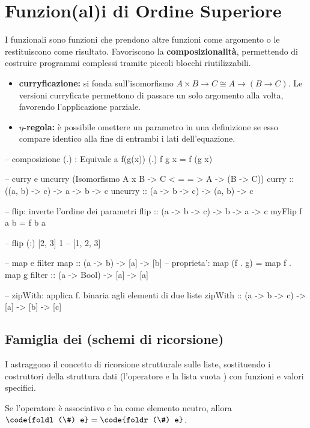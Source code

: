 \section{Funzion(al)i di Ordine Superiore}
I funzionali sono funzioni che prendono altre funzioni come argomento o le restituiscono come risultato. Favoriscono la \textbf{composizionalità}, permettendo di costruire programmi complessi tramite piccoli blocchi riutilizzabili.

\begin{itemize}
    \item \textbf{curryficazione:} si fonda sull'isomorfismo $A \times B \rightarrow C \cong A \rightarrow (B \rightarrow C)$. Le versioni curryficate permettono di passare un solo argomento alla volta, favorendo l'applicazione parziale.
    \item \textbf{$\eta$-regola:} è possibile omettere un parametro in una definizione se esso compare identico alla fine di entrambi i lati dell'equazione.
\end{itemize}

\begin{haskellbox}{}
-- composizione (.) : Equivale a f(g(x))
(.) f g x = f (g x)

-- curry e uncurry (Isomorfismo A x B -> C  < = = >  A -> (B -> C))
curry :: ((a, b) -> c) -> a -> b -> c
uncurry :: (a -> b -> c) -> (a, b) -> c

-- flip: inverte l'ordine dei parametri
flip :: (a -> b -> c) -> b -> a -> c
myFlip f a b = f b a

-- flip (:) [2, 3] 1
-- [1, 2, 3]

-- map e filter
map :: (a -> b) -> [a] -> [b]         -- proprieta': map (f . g) = map f . map g
filter :: (a -> Bool) -> [a] -> [a]

-- zipWith: applica f. binaria agli elementi di due liste
zipWith :: (a -> b -> c) -> [a] -> [b] -> [c]
\end{haskellbox}

\subsection{Famiglia dei  (schemi di ricorsione)}
I  astraggono il concetto di ricorsione strutturale sulle liste, sostituendo i costruttori della struttura dati (l'operatore \code{(:)} e la lista vuota \code{[]}) con funzioni e valori specifici. 

Se l'operatore \code{\#} è associativo e ha  come elemento neutro, allora $\code{foldl (\#) e} = \code{foldr (\#) e}$.

